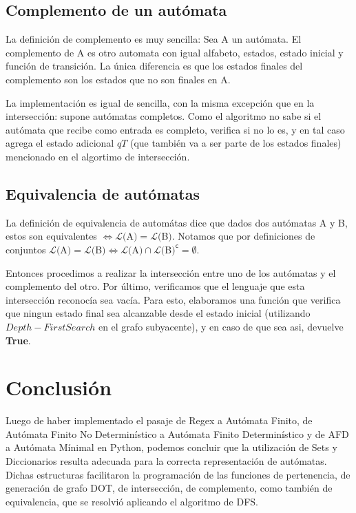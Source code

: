 \documentclass[a4paper, 10pt, twoside]{article}
\begin{document}
\subsection{Complemento de un autómata}

La definición de complemento es muy sencilla: Sea A un autómata. El complemento de A es otro automata con igual alfabeto, estados, estado inicial y función de transición. La única diferencia es que los estados finales del complemento son los estados que no son finales en A.

La implementación es igual de sencilla, con la misma excepción que en la intersección: supone autómatas completos. Como el algoritmo no sabe si el autómata que recibe como entrada es completo, verifica si no lo es, y en tal caso agrega el estado adicional $qT$ (que también va a ser parte de los estados finales) mencionado en el algortimo de intersección.

\subsection{Equivalencia de autómatas}

La definición de equivalencia de automátas dice que dados dos autómatas A y B, estos son equivalentes $\Leftrightarrow \mathcal{L}($A$) = \mathcal{L}($B$)$. Notamos que por definiciones de conjuntos $\mathcal{L}($A$) = \mathcal{L}($B$) \Leftrightarrow \mathcal{L}($A$) \cap \mathcal{L}($B$)^\mathsf{c} = \emptyset$.

Entonces procedimos a realizar la intersección entre uno de los autómatas y el complemento del otro.
Por último, verificamos que el lenguaje que esta intersección reconocía sea vacía. Para esto, elaboramos una función que verifica que ningun estado final sea alcanzable desde el estado inicial (utilizando $Depth-First Search$ en el grafo subyacente), y en caso de que sea asi, devuelve \textbf{True}.

\newpage
\section{Conclusión}
Luego de haber implementado el pasaje de Regex a Autómata Finito, de Autómata Finito No Determinístico a Autómata Finito Determinístico y de AFD a Autómata Mínimal en Python, podemos concluir que la utilización de Sets y Diccionarios resulta adecuada para la correcta representación de autómatas. Dichas estructuras facilitaron la programación de las funciones de pertenencia, de generación de grafo DOT, de intersección, de complemento, como también de equivalencia, que se resolvió aplicando el algoritmo de DFS.
\end{document}
